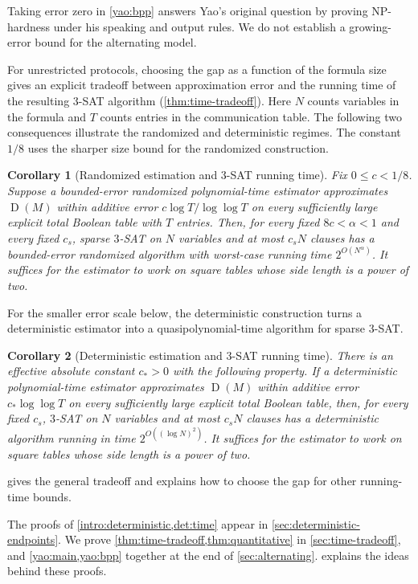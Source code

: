 \documentclass[11pt,letterpaper]{article} \usepackage[utf8]{inputenc}
\theoremstyle{plain} \newtheorem{theorem}{Theorem}[section]
\newtheorem{corollary}[corollary]{Corollary} \aliascntresetthe{corollary}
\theoremstyle{definition} \newaliascnt{definition}{theorem}
\newcommand{\D}{\operatorname{D}}
\begin{document}
Taking error zero in \cref{yao:bpp} answers Yao's original question by
proving NP-hardness under his speaking and output rules. We do not establish
a growing-error bound for the alternating model.

For unrestricted protocols, choosing the gap as a function of the formula
size gives an explicit tradeoff between approximation error and the
running time of the resulting $3$-SAT algorithm
(\cref{thm:time-tradeoff}). Here $N$ counts variables in the formula and
$T$ counts entries in the communication table. The following two
consequences illustrate the randomized and deterministic regimes. The
constant $1/8$ uses the sharper size bound for the randomized
construction.

\begin{corollary}[Randomized estimation and $3$-SAT running time]
\label{thm:quantitative}
Fix $0\le c<1/8$. Suppose a bounded-error randomized polynomial-time
estimator approximates $\D(M)$ within additive error
$c\log T/\log\log T$ on every sufficiently large explicit total Boolean
table with $T$ entries. Then, for every fixed $8c<\alpha<1$ and every
fixed $c_s$, sparse $3$-SAT on $N$ variables and at most $c_sN$ clauses has
a bounded-error randomized algorithm with worst-case running time
$2^{O(N^\alpha)}$. It suffices for the estimator to work on square tables
whose side length is a power of two.
\end{corollary}

For the smaller error scale below, the deterministic construction turns a
deterministic estimator into a quasipolynomial-time algorithm for sparse
$3$-SAT.

\begin{corollary}[Deterministic estimation and $3$-SAT running time]
\label{det:time}
There is an effective absolute constant $c_*>0$ with the following property.
If a deterministic polynomial-time estimator approximates $\D(M)$ within
additive error $c_*\log\log T$ on every sufficiently large explicit total
Boolean table, then, for every fixed $c_s$, $3$-SAT on $N$ variables and
at most $c_sN$ clauses has a deterministic algorithm running in time
$2^{O((\log N)^2)}$. It suffices for the estimator to work on square tables
whose side length is a power of two.
\end{corollary}

 gives the general tradeoff and explains how to choose
the gap for other running-time bounds.

The proofs of \cref{intro:deterministic,det:time} appear in
\cref{sec:deterministic-endpoints}. We prove
\cref{thm:time-tradeoff,thm:quantitative} in \cref{sec:time-tradeoff}, and
\cref{yao:main,yao:bpp} together at the end of
\cref{sec:alternating}.  explains the ideas behind these proofs.
\end{document}
